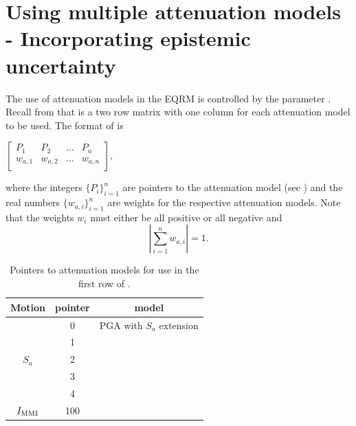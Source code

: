\section{Using multiple attenuation models - Incorporating epistemic uncertainty}
\label{sec:attn-multi-attnmodels}

The use of attenuation models in the EQRM is controlled by the
 parameter .
Recall from  that
 is a two row matrix with one
column for each attenuation model to be used. The format of
 is
\begin{center}
\begin{math}
 \left[ \begin{array}{ccccc}
P_1 & P_2 &  \hdots & P_n \\
w_{a,1} & w_{a,2} &  \hdots & w_{a,n} \\
\end{array} \right],
\end{math}
\end{center}
where the integers $\{P_i\}_{i=1}^n$ are pointers to the
attenuation model (see ) and the real numbers
$\{w_{a,i}\}_{i=1}^n$ are weights for the respective attenuation
models. Note that the weights $w_i$ must either be all positive or
all negative and
\begin{equation}
\left|\sum_{i=1}^{n}w_{a,i}\right| = 1.
\end{equation}
\begin{table}
\caption{Pointers to attenuation models for use in the first row
of .} \vspace{0.8em}
\label{tab:attn-flags}
\begin{center}
\begin{tabular}{|c|c|c|}
\hline \textbf{Motion} & \textbf{pointer} & \textbf{model} \\
\hline
 & 0 & \cite{dr_Gaull90a} PGA with $S_a$ extension\\
 & 1 & \cite{dr_Toro97a} \\
$S_a$ & 2 & \cite{dr_Atkinson97a} \\
 & 3 & \cite{dr_Sadigh97a} \\
 & 4 & \cite{dr_Somerville01a} \\
\hline
 $\Imm$ & 100 & \cite{dr_Gaull90a} \\
\hline
\end{tabular}
\end{center}
\end{table}

